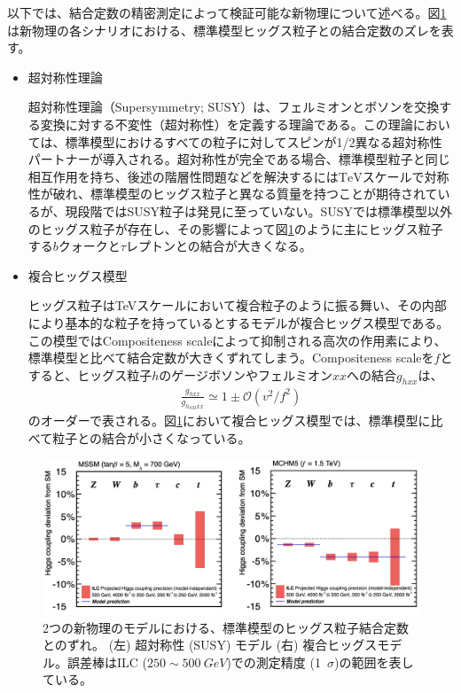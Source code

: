 以下では、結合定数の精密測定によって検証可能な新物理について述べる。図\ref{bsmdecay}は新物理の各シナリオにおける、標準模型ヒッグス粒子との結合定数のズレを表す。
\begin{itemize}
\item{超対称性理論}

超対称性理論（Supersymmetry; SUSY）は、フェルミオンとボソンを交換する変換に対する不変性（超対称性）を定義する理論である。この理論においては、標準模型におけるすべての粒子に対してスピンが1/2異なる超対称性パートナーが導入される。超対称性が完全である場合、標準模型粒子と同じ相互作用を持ち、後述の階層性問題などを解決するには$\mathrm{TeV}$スケールで対称性が破れ、標準模型のヒッグス粒子と異なる質量を持つことが期待されているが、現段階ではSUSY粒子は発見に至っていない。SUSYでは標準模型以外のヒッグス粒子が存在し、その影響によって図\ref{bsmdecay}のように主にヒッグス粒子する$b$クォークと$\tau$レプトンとの結合が大きくなる。
\item{複合ヒッグス模型}

ヒッグス粒子はTeVスケールにおいて複合粒子のように振る舞い、その内部により基本的な粒子を持っているとするモデルが複合ヒッグス模型である。この模型ではCompositeness scaleによって抑制される高次の作用素により、標準模型と比べて結合定数が大きくずれてしまう。Compositeness scaleを$f$とすると、ヒッグス粒子$h$のゲージボソンやフェルミオン$xx$への結合$g_{hxx}$は、
\begin{align}
\frac{g_{hxx}}{g_{h_{SM}xx}} \simeq 1 \pm \mathcal{O}(v^2 / f^2)
\end{align}
のオーダーで表される。図\ref{bsmdecay}において複合ヒッグス模型では、標準模型に比べて粒子との結合が小さくなっている。
\end{itemize}
\begin{figure}[H]
	\begin{center}
 \includegraphics[keepaspectratio, scale=0.25]
 	{Figure/Introduction/bsmdecay.png}
 		\caption[SUSY, 複合ヒッグスモデルにおけるヒッグス結合定数]{2つの新物理のモデルにおける、標準模型のヒッグス粒子結合定数とのずれ。 (左) 超対称性 (SUSY) モデル (右) 複合ヒッグスモデル。誤差棒はILC ($250 \sim \SI{500}{GeV}$)での測定精度 (1\, $\sigma$)の範囲を表している。\cite{decaybsm}}
 		\label{bsmdecay}
	\end{center}
\end{figure}
